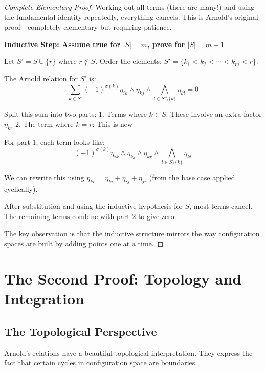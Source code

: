 \begin{proof}[Complete Elementary Proof]
Working out all terms (there are many!) and using the fundamental identity repeatedly, everything cancels. This is Arnold's original proof—completely elementary but requiring patience.

\textbf{Inductive Step: Assume true for $|S| = m$, prove for $|S| = m+1$}

Let $S' = S \cup \{r\}$ where $r \notin S$. Order the elements: $S' = \{k_1 < k_2 < \cdots < k_m < r\}$.

The Arnold relation for $S'$ is:
$$\sum_{k \in S'} (-1)^{\sigma(k)} \eta_{ik} \wedge \eta_{kj} \wedge \bigwedge_{l \in S'\setminus\{k\}} \eta_{kl} = 0$$

Split this sum into two parts:
1. Terms where $k \in S$: These involve an extra factor $\eta_{kr}$
2. The term where $k = r$: This is new

For part 1, each term looks like:
$$(-1)^{\sigma(k)} \eta_{ik} \wedge \eta_{kj} \wedge \eta_{kr} \wedge \bigwedge_{l \in S\setminus\{k\}} \eta_{kl}$$

We can rewrite this using $\eta_{kr} = \eta_{ki} + \eta_{ij} + \eta_{jr}$ (from the base case applied cyclically). 

After substitution and using the inductive hypothesis for $S$, most terms cancel. The remaining terms combine with part 2 to give zero.

The key observation is that the inductive structure mirrors the way configuration spaces are built by adding points one at a time.
\end{proof}

\section{The Second Proof: Topology and Integration}

\subsection{The Topological Perspective}

Arnold's relations have a beautiful topological interpretation. They express the fact that certain cycles in configuration space are boundaries.


